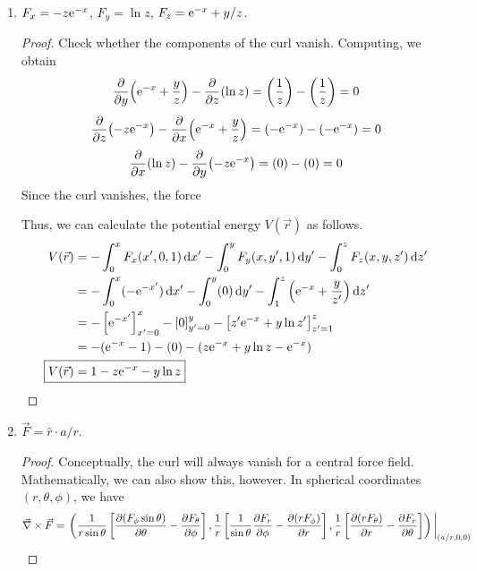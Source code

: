 \documentclass[../psets.tex]{subfiles}
\begin{document}
\begin{enumerate}
\begin{enumerate}
\begin{proof}
        \end{proof}
        \item $F_x=-z\e[-x]$, $F_y=\ln z$, $F_z=\e[-x]+y/z$.
        \begin{proof}
            Check whether the components of the curl vanish. Computing, we obtain
            \begin{equation*}
                \pdv{y}(\e[-x]+\frac{y}{z})-\pdv{z}(\ln z) = \left( \frac{1}{z} \right)-\left( \frac{1}{z} \right)
                = 0
            \end{equation*}
            \begin{equation*}
                \pdv{z}(-z\e[-x])-\pdv{x}(\e[-x]+\frac{y}{z}) = (-\e[-x])-(-\e[-x])
                = 0
            \end{equation*}
            \begin{equation*}
                \pdv{x}(\ln z)-\pdv{y}(-z\e[-x]) = (0)-(0)
                = 0
            \end{equation*}
            Since the curl vanishes, the force \par
            Thus, we can calculate the potential energy $V(\vec{r})$ as follows.
            \begin{align*}
                V(\vec{r}) &= -\int_0^xF_x(x',0,1)\dd{x'}-\int_0^yF_y(x,y',1)\dd{y'}-\int_0^zF_z(x,y,z')\dd{z'}\\
                &= -\int_0^x(-\e[-x'])\dd{x'}-\int_0^y(0)\dd{y'}-\int_1^z\left( \e[-x]+\frac{y}{z'} \right)\dd{z'}\\
                &= -\left[ \e[-x'] \right]_{x'=0}^x-\left[ 0 \right]_{y'=0}^y-\left[ z'\e[-x]+y\ln z' \right]_{z'=1}^z\\
                &= -(\e[-x]-1)-(0)-(z\e[-x]+y\ln z-\e[-x])\\
                \Aboxed{V(\vec{r}) &= 1-z\e[-x]-y\ln z}
            \end{align*}
        \end{proof}
        \item $\vec{F}=\hat{r}\cdot a/r$.
        \begin{proof}
            Conceptually, the curl will always vanish for a central force field. Mathematically, we can also show this, however. In spherical coordinates $(r,\theta,\phi)$, we have
            \begin{align*}
                \vec{\nabla}\times\vec{F} &= \eval{\left( \frac{1}{r\sin\theta}\left[ \pdv{(F_\phi\sin\theta)}{\theta}-\pdv{F_\theta}{\phi} \right],\frac{1}{r}\left[ \frac{1}{\sin\theta}\pdv{F_r}{\phi}-\pdv{(rF_\phi)}{r} \right],\frac{1}{r}\left[ \pdv{(rF_\theta)}{r}-\pdv{F_r}{\theta} \right] \right)}_{(a/r,0,0)}\\

\end{align*}
\end{proof}
\end{enumerate}
\end{enumerate}
\end{document}
